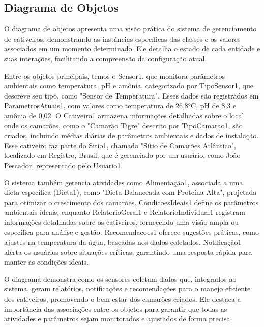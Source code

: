 \documentclass[
  a4paper,
  12pt,
  english,
  brazilian,
]{article}
\begin{document}
    \newpage

    \subsection*{\textbf{Diagrama de Objetos}}

O diagrama de objetos apresenta uma visão prática do sistema de gerenciamento de cativeiros, demonstrando as instâncias específicas das classes e os valores associados em um momento determinado. Ele detalha o estado de cada entidade e suas interações, facilitando a compreensão da configuração atual. 

Entre os objetos principais, temos o Sensor1, que monitora parâmetros ambientais como temperatura, pH e amônia, categorizado por TipoSensor1, que descreve seu tipo, como "Sensor de Temperatura". Esses dados são registrados em ParametrosAtuais1, com valores como temperatura de 26,8°C, pH de 8,3 e amônia de 0,02. O Cativeiro1 armazena informações detalhadas sobre o local onde os camarões, como o "Camarão Tigre" descrito por TipoCamarao1, são criados, incluindo médias diárias de parâmetros ambientais e dados de instalação. Esse cativeiro faz parte do Sitio1, chamado "Sítio de Camarões Atlântico", localizado em Registro, Brasil, que é gerenciado por um usuário, como João Pescador, representado pelo Usuario1. 

O sistema também gerencia atividades como Alimentação1, associada a uma dieta específica (Dieta1), como "Dieta Balanceada com Proteína Alta", projetada para otimizar o crescimento dos camarões. CondicoesIdeais1 define os parâmetros ambientais ideais, enquanto RelatorioGeral1 e RelatorioIndividual1 registram informações detalhadas sobre os cativeiros, fornecendo uma visão ampla ou específica para análise e gestão. Recomendacoes1 oferece sugestões práticas, como ajustes na temperatura da água, baseadas nos dados coletados. Notificação1 alerta os usuários sobre situações críticas, garantindo uma resposta rápida para manter as condições ideais. 

O diagrama demonstra como os sensores coletam dados que, integrados ao sistema, geram relatórios, notificações e recomendações para o manejo eficiente dos cativeiros, promovendo o bem-estar dos camarões criados. Ele destaca a importância das associações entre os objetos para garantir que todas as atividades e parâmetros sejam monitorados e ajustados de forma precisa.
\end{document}
